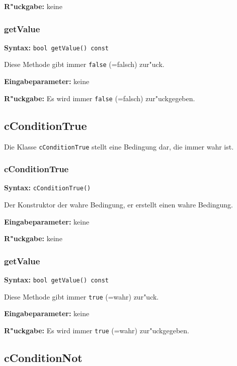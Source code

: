 \bigskip\noindent
\textbf{R"uckgabe:} keine


\subsubsection{getValue}

\textbf{Syntax:} \verb|bool getValue() const|

\bigskip\noindent
Diese Methode gibt immer \verb|false| (=falsch) zur"uck.

\bigskip\noindent
\textbf{Eingabeparameter:} keine

\bigskip\noindent
\textbf{R"uckgabe:} Es wird immer \verb|false| (=falsch) zur"uckgegeben.


\subsection{cConditionTrue}

Die Klasse \verb|cConditionTrue| stellt eine Bedingung dar, die immer wahr ist.

\subsubsection{cConditionTrue}

\textbf{Syntax:} \verb|cConditionTrue()|

\bigskip\noindent
Der Konstruktor der wahre Bedingung, er erstellt einen wahre Bedingung.

\bigskip\noindent
\textbf{Eingabeparameter:} keine

\bigskip\noindent
\textbf{R"uckgabe:} keine


\subsubsection{getValue}

\textbf{Syntax:} \verb|bool getValue() const|

\bigskip\noindent
Diese Methode gibt immer \verb|true| (=wahr) zur"uck.

\bigskip\noindent
\textbf{Eingabeparameter:} keine

\bigskip\noindent
\textbf{R"uckgabe:} Es wird immer \verb|true| (=wahr) zur"uckgegeben.



\subsection{cConditionNot}

